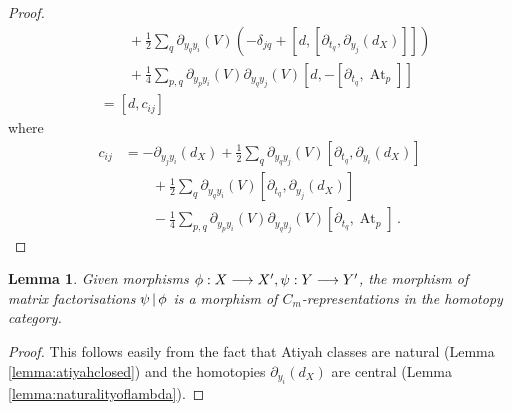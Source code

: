 \documentclass[english,letter paper,12pt,leqno]{article}
\newtheorem{lemma}[theorem]{Lemma}
\theoremstyle{example}
\numberwithin{equation}{section}
\DeclareMathOperator{\At}{At}
\begin{document}
\begin{proof}
\begin{align*}
&\qquad + \frac{1}{2} \sum_q \partial_{y_qy_i}(V) \left( -\delta_{jq} + [d, [\partial_{t_q}, \partial_{y_j}(d_X)]] \right)\\
&\qquad + \frac{1}{4}\sum_{p,q} \partial_{y_py_i}(V) \partial_{y_qy_j}(V) [d, -[\partial_{t_q}, \At_p]]\\
&= [d, c_{ij}]
\end{align*}
where
\begin{align*}
c_{ij} &= - \partial_{y_jy_i}(d_X) + \frac{1}{2} \sum_q \partial_{y_qy_j}(V)  [\partial_{t_q}, \partial_{y_i}(d_X)]\\
&\qquad + \frac{1}{2} \sum_q \partial_{y_qy_i}(V) [\partial_{t_q}, \partial_{y_j}(d_X)]\\
&\qquad - \frac{1}{4} \sum_{p,q}  \partial_{y_py_i}(V) \partial_{y_qy_j}(V)  [\partial_{t_q}, \At_p]\,.
\end{align*}
\end{proof}

\begin{lemma}\label{prop:morphismsarecliffordreps} Given morphisms $\phi: X \longrightarrow X', \psi: Y \longrightarrow Y'$, the morphism of matrix factorisations $\psi \,|\, \phi$ is a morphism of $C_m$-representations in the homotopy category.
\end{lemma}
\begin{proof}
This follows easily from the fact that Atiyah classes are natural (Lemma \ref{lemma:atiyahclosed}) and the homotopies $\partial_{y_i}(d_X)$ are central (Lemma \ref{lemma:naturalityoflambda}).
\end{proof}
\end{document}
